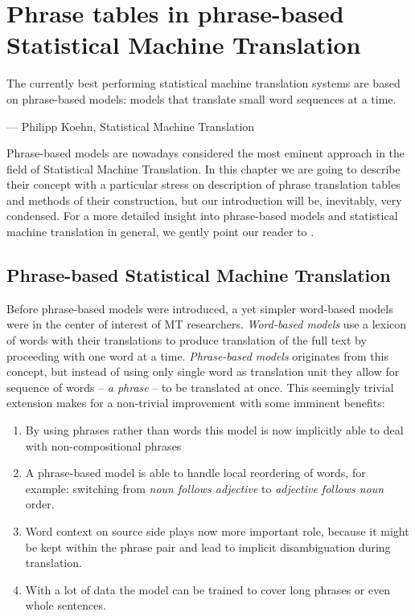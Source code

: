 
\chapter{Phrase tables in phrase-based Statistical Machine Translation}
\label{chap:phrase-based}


\setlength{\epigraphwidth}{1.0\textwidth}
\epigraph{The currently best performing statistical machine translation systems are based on
phrase-based models: models that translate small word sequences at a time.}{--- Philipp Koehn, Statistical Machine Translation}

Phrase-based models are nowadays considered the most eminent approach
in the field of Statistical Machine Translation.
In this chapter we are going to describe their concept with a particular stress
on description of phrase translation tables and methods of their construction,
but our introduction will be, inevitably, very condensed.
For a more detailed insight into phrase-based models and statistical machine
translation in general, we gently point our reader to \citet{koehn:smt}.

\section{Phrase-based Statistical Machine Translation}

Before phrase-based models were introduced, a yet simpler word-based models were in
the center of interest of MT researchers.
\emph{Word-based models} use a lexicon of words with their translations to produce
translation of the full text by proceeding with one word at a time.
\emph{Phrase-based models} originates from this concept, but instead of using only
single word as translation unit they allow for sequence of words -- \emph{a phrase}
-- to be translated at once.
This seemingly trivial extension makes for a non-trivial improvement with some
imminent benefits:
\begin{enumerate}
  \item By using phrases rather than words this model is now implicitly able to deal
    with non-compositional phrases
  \item A phrase-based model is able to handle local reordering of words, for example:
    switching from \emph{noun follows adjective} to \emph{adjective follows noun} order.
  \item Word context on source side plays now more important role, because it might be kept
    within the phrase pair and lead to implicit disambiguation during translation.
  \item With a lot of data the model can be trained to cover long phrases or even
    whole sentences.
\end{enumerate}

